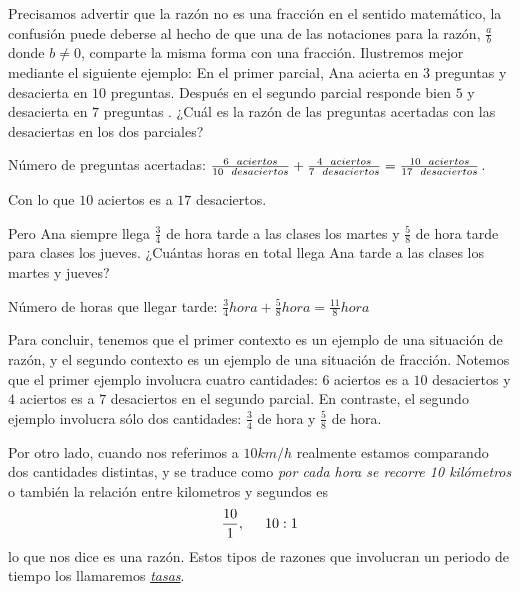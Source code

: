 \documentclass[
]{book}
\begin{document}
Precisamos advertir que la razón no es una fracción en el sentido matemático, la confusión puede deberse al hecho de que una de las notaciones para la razón, \(\frac{a}{b}\) donde \(b\neq 0\), comparte la misma forma con una fracción. Ilustremos mejor mediante el siguiente ejemplo:
En el primer parcial, Ana acierta en \(3\) preguntas y desacierta en \(10\) preguntas. Después en el segundo parcial responde bien \(5\) y desacierta en \(7\) preguntas . ¿Cuál es la razón de las preguntas acertadas con las desaciertas en los dos parciales?

Número de preguntas acertadas:
\(\frac{6 \hspace{2mm} aciertos}{10 \hspace{2mm} desaciertos}+\frac{4\hspace{2mm} aciertos}{7\hspace{2mm} desaciertos}=\frac{10 \hspace{2mm} aciertos}{17 \hspace{2mm} desaciertos}\).

Con lo que \(10\) aciertos es a \(17\) desaciertos.

Pero Ana siempre llega \(\frac{3}{4}\) de hora tarde a las clases los martes y \(\frac{5}{8}\) de hora tarde para clases los jueves. ¿Cuántas horas en total llega Ana tarde a las clases los martes y jueves?

Número de horas que llegar tarde:
\(\frac{3}{4}hora+\frac{5}{8}hora=\frac{11}{8}hora\)

Para concluir, tenemos que el primer contexto es un ejemplo de una situación de razón, y el segundo contexto es un ejemplo de una situación de fracción. Notemos que el primer ejemplo involucra cuatro cantidades: \(6\) aciertos es a \(10\) desaciertos y \(4\) aciertos es a \(7\) desaciertos en el segundo parcial. En contraste, el segundo ejemplo involucra sólo dos cantidades: \(\frac{3}{4}\) de hora y \(\frac{5}{8}\) de hora.

Por otro lado, cuando nos referimos a \(10 km/h\) realmente estamos comparando dos cantidades distintas, y se traduce como \emph{por cada hora se recorre 10 kilómetros} o también la relación entre kilometros y segundos es
\[\begin{equation}
\frac{10}{1}, \hspace{5mm} 10:1
\end{equation}\]
lo que nos dice es una razón. Estos tipos de razones que involucran un periodo de tiempo los llamaremos \protect\hyperlink{tasas}{\emph{tasas}}.
\end{document}
